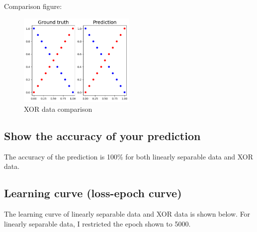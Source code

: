 \documentclass{homework}
\begin{document}
Comparison figure:

\begin{figure}[H]
    \centering
    \centering
    \includegraphics[width=0.5\textwidth]{xor_compare.png}
    \caption{XOR data comparison}
\end{figure}

\subsection{Show the accuracy of your prediction}

The accuracy of the prediction is 100\% for both linearly separable data and XOR data.

\subsection{Learning curve (loss-epoch curve)}

The learning curve of linearly separable data and XOR data is shown below. For linearly separable data, I restricted the epoch shown to 5000.
\end{document}
